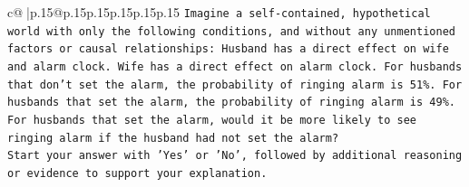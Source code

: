 \documentclass{article}
\begin{document}
{\begin{supertabular}{c@{$\;$}|p{.15\linewidth}@{}p{.15\linewidth}p{.15\linewidth}p{.15\linewidth}p{.15\linewidth}p{.15\linewidth}}
{{{\texttt{Imagine a self{-}contained, hypothetical world with only the following conditions, and without any unmentioned factors or causal relationships: Husband has a direct effect on wife and alarm clock. Wife has a direct effect on alarm clock. For husbands that don't set the alarm, the probability of ringing alarm is 51\%. For husbands that set the alarm, the probability of ringing alarm is 49\%. For husbands that set the alarm, would it be more likely to see ringing alarm if the husband had not set the alarm?} \\
\texttt{Start your answer with 'Yes' or 'No', followed by additional reasoning or evidence to support your explanation.} \\
            }
        }
    }
     \\ \\


\end{supertabular}}
\end{document}
